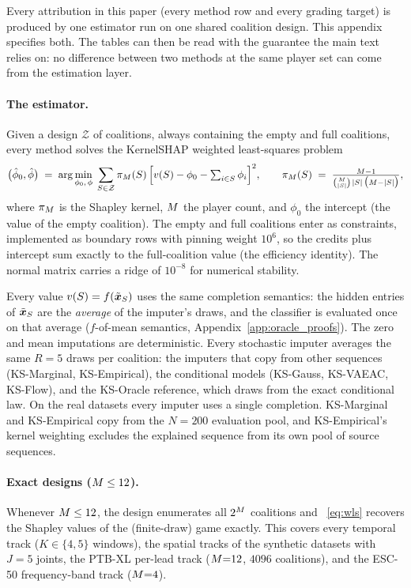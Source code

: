 Every attribution in this paper (every method row and every grading
target) is produced by one estimator run on one shared coalition design.
This appendix specifies both.  The tables can then be read with the
guarantee the main text relies on: no difference between two methods at the
same player set can come from the estimation layer.

\paragraph{The estimator.}
Given a design $\mathcal{Z}$ of coalitions, always containing the empty and
full coalitions, every method solves the KernelSHAP weighted least-squares
problem
\begin{equation}
  \bigl(\hat\phi_0, \hat{\phi}\bigr) \;=\; \arg\min_{\phi_0,\,\phi}\;
  \sum_{S \in \mathcal{Z}} \pi_{M}(S)\,
  \Bigl[v(S) - \phi_0 - \textstyle\sum_{i \in S} \phi_i\Bigr]^2,
  \qquad
  \pi_{M}(S) \;=\; \frac{M - 1}{\binom{M}{|S|}\,|S|\,\bigl(M - |S|\bigr)},
  \label{eq:wls}
\end{equation}
where $\pi_{M}$ is the Shapley kernel, $M$ the player count, and
$\phi_0$ the intercept (the value of the empty coalition).  The empty and
full coalitions enter as constraints, implemented as boundary rows with
pinning weight $10^{6}$, so the credits plus intercept sum exactly to the
full-coalition value (the efficiency identity).  The normal
matrix carries a ridge of $10^{-8}$ for numerical stability.

Every value $v(S) = f(\tilde{\bm{x}}_{S})$ uses the same completion
semantics: the hidden entries of $\tilde{\bm{x}}_{S}$ are the \emph{average} of
the imputer's draws, and the classifier is evaluated once on that average
($f$-of-mean semantics, Appendix~\ref{app:oracle_proofs}).  The zero and
mean imputations are deterministic.  Every stochastic imputer averages the
same $R{=}5$ draws per coalition: the imputers that copy from other
sequences (KS-Marginal, KS-Empirical), the conditional models (KS-Gauss,
KS-VAEAC, KS-Flow), and the KS-Oracle reference, which draws from the exact
conditional law.  On the real datasets every imputer uses a single
completion.  KS-Marginal and KS-Empirical copy from the $N{=}200$
evaluation pool, and KS-Empirical's kernel weighting excludes the explained
sequence from its own pool of source sequences.

\paragraph{Exact designs ($M \leq 12$).}
Whenever $M \leq 12$, the design enumerates all $2^{M}$ coalitions and
~\eqref{eq:wls} recovers the Shapley values of the (finite-draw) game
exactly.  This covers every temporal track ($K \in \{4,5\}$ windows), the
spatial tracks of the synthetic datasets with $J{=}5$ joints, the PTB-XL
per-lead track ($M{=}12$, $4096$ coalitions), and the ESC-50
frequency-band track ($M{=}4$).

